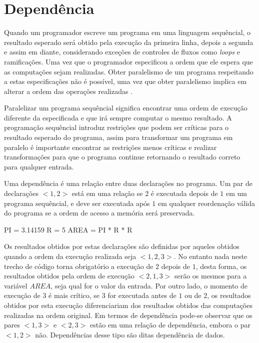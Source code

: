
\section{Dependência}

Quando um programador escreve um programa em uma linguagem sequêncial, o
resultado esperado será obtido pela execução da primeira linha, depois a segunda
e assim em diante, considerando exceções de controles de fluxos como
\textit{loops} e ramificações. 
Uma vez que o programador especificou a ordem que ele espera que as computações 
sejam realizadas. 
Obter paralelismo de um programa respeitando a estas especificações não é
possível, uma vez que obter paralelismo implica em alterar a ordem das
operações realizadas \cite[1.8]{ocfma}.

Paralelizar um programa sequêncial significa encontrar uma ordem de execução
diferente da especificada e que irá sempre computar o mesmo resultado.
A programação sequêncial introduz restrições que podem ser críticas para o
resultado esperado do programa, assim para transformar um programa em paralelo é
importante encontrar as restrições menos críticas e realizar transformações para
que o programa continue retornando o resultado correto para qualquer entrada.



Uma dependência é uma relação entre duas declarações no programa. 
Um par de declarações $<1,2>$ está em uma relação se $2$ é executada 
depois de $1$ em um programa sequêncial, e deve ser executada após $1$ 
em qualquer reordenação válida do programa se a ordem de acesso a 
memória será preservada.

\begin{algorithm}
        \begin{algorithmic}[1]
                \STATE PI = 3.14159
                \STATE R = 5
                \STATE AREA = PI * R * R
\end{algorithmic}
\end{algorithm}


Os resultados obtidos por estas declarações são definidas por aqueles obtidos
quando a ordem da execução realizada seja $<1,2,3>$. 
No entanto nada neste trecho de código torna obrigatório a execução de 
$2$ depois de $1$, desta forma, os resultados obtidos pela ordem de execução 
$<2,1,3>$ serão os mesmos para a variável $AREA$, seja qual for o valor 
da entrada.
Por outro lado, o momento de execução de $3$ é mais crítico, se $3$ for
executada antes de $1$ ou de $2$, os resultados obtidos por esta execução
diferenciariam dos resultados obtidos das computações realizadas na ordem
original.
Em termos de dependência pode-se observar que os pares $<1,3>$ e $<2,3>$
estão em uma relação de dependência, embora o par $<1,2>$ não.
Dependências desse tipo são ditas dependência de dados.

